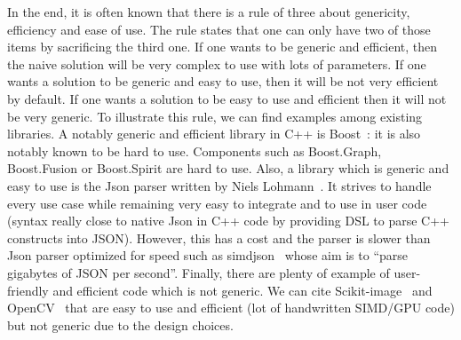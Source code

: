 
In the end, it is often known that there is a rule of three about genericity, efficiency and ease of use. The rule
states that one can only have two of those items by sacrificing the third one. If one wants to be generic and efficient,
then the naive solution will be very complex to use with lots of parameters. If one wants a solution to be generic and
easy to use, then it will be not very efficient by default. If one wants a solution to be easy to use and efficient then
it will not be very generic. To illustrate this rule, we can find examples among existing libraries. A notably generic
and efficient library in C++ is Boost~\parencite{boost.2021}: it is also notably known to be hard to use. Components
such as Boost.Graph, Boost.Fusion or Boost.Spirit are hard to use. Also, a library which is generic and easy to use is
the Json parser written by Niels Lohmann~\parencite{nlohmann.2021.json}. It strives to handle every use case while
remaining very easy to integrate and to use in user code (syntax really close to native Json in C++ code by providing
DSL to parse C++ constructs into JSON). However, this has a cost and the parser is slower than Json parser optimized for
speed such as simdjson~\parencite{lemire.2021.simdjson} whose aim is to ``parse gigabytes of JSON per second''. Finally,
there are plenty of example of user-friendly and efficient code which is not generic. We can cite
Scikit-image~\parencite{vanderwalt.2014.skimage} and OpenCV~\parencite{bradski.2000.opencv} that are easy to use and
efficient (lot of handwritten SIMD/GPU code) but not generic due to the design choices.

